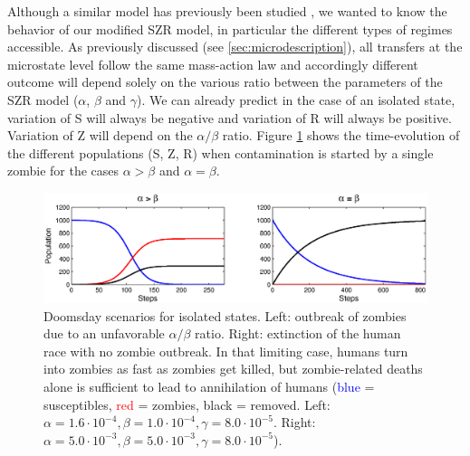 \documentclass[11pt]{article} %
\begin{document}
Although a similar model has previously been studied \cite{munz2009zombies}, we wanted to know the behavior of our modified SZR model, in particular the different types of regimes accessible. As previously discussed (see \ref{sec:microdescription}), all transfers at the microstate level follow the same mass-action law and accordingly different outcome will depend solely on the various ratio between the parameters of the SZR model ($\alpha$, $\beta$ and  $\gamma$). We can already predict in the case of an isolated state, variation of S will always be negative and variation of R will always be positive. Variation of Z will depend on the $\alpha/\beta$ ratio. Figure \ref{deathS} shows the time-evolution of the different populations (S, Z, R) when contamination is started by a single zombie for the cases $\alpha>\beta$ and $\alpha=\beta$.
\begin{figure}[h!]
\centerline{
\includegraphics[scale=0.65]{../images/Matlab_figures/model-AgeB.eps}}
\caption{Doomsday scenarios for isolated states. Left: outbreak of zombies due to an unfavorable $\alpha/\beta$ ratio. Right: extinction of the human race with no zombie outbreak. In that limiting case, humans turn into zombies as fast as zombies get killed, but zombie-related deaths alone is sufficient to lead to annihilation of humans (\textcolor{blue}{blue} = susceptibles, \textcolor{red}{red} = zombies, black = removed. Left: $\alpha=1.6\cdot10^{-4}, \beta=1.0\cdot10^{-4}, \gamma=8.0\cdot10^{-5}$. Right: $\alpha=5.0\cdot10^{-3}, \beta=5.0\cdot10^{-3}, \gamma=8.0\cdot10^{-5} $). \label{deathS} }
\end{figure}
\end{document}
